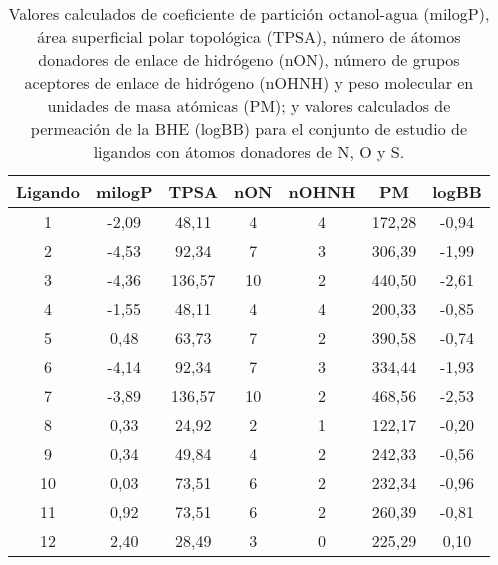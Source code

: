 \clearpage

\clearpage

\begin{table}[h]
\centering
\caption{Valores calculados de coeficiente de partición octanol-agua (milogP), área superficial polar topológica (TPSA), número de átomos donadores de enlace de hidrógeno (nON), número de grupos aceptores de enlace de hidrógeno (nOHNH) y peso molecular en unidades de masa atómicas (PM); y valores calculados de permeación de la BHE (logBB) para el conjunto de estudio de ligandos con átomos donadores de N, O y S.}
\begin{tabular}{c|ccccc|c}
\hline
\textbf{Ligando} & \textbf{milogP} & \textbf{TPSA} & \textbf{nON} & \textbf{nOHNH} & \textbf{PM} & \textbf{logBB} \\ \hline
1                & -2,09            & 48,11         & 4            & 4              & 172,28      & -0,94          \\
2                & -4,53            & 92,34         & 7            & 3              & 306,39      & -1,99          \\
3                & -4,36            & 136,57        & 10           & 2              & 440,50      & -2,61          \\
4                & -1,55            & 48,11         & 4            & 4              & 200,33      & -0,85          \\
5                & 0,48             & 63,73         & 7            & 2              & 390,58      & -0,74          \\
6                & -4,14            & 92,34         & 7            & 3              & 334,44      & -1,93          \\
7                & -3,89            & 136,57        & 10           & 2              & 468,56      & -2,53          \\
8                & 0,33             & 24,92         & 2            & 1              & 122,17      & -0,20          \\
9                & 0,34             & 49,84         & 4            & 2              & 242,33      & -0,56          \\
10               & 0,03             & 73,51         & 6            & 2              & 232,34      & -0,96          \\
11               & 0,92             & 73,51         & 6            & 2              & 260,39      & -0,81          \\
12               & 2,40             & 28,49         & 3            & 0              & 225,29      & 0,10           \\

\end{tabular}
\end{table}
